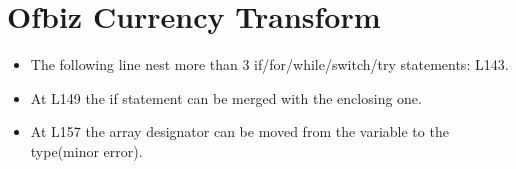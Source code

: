 \section{Ofbiz Currency Transform}
\begin{itemize}
\item The following line nest more than 3 if/for/while/switch/try statements: L143.
\item At L149 the if statement can be merged with the enclosing one.
\item At L157 the array designator can be moved from the variable to the type(minor error).
\end{itemize}

